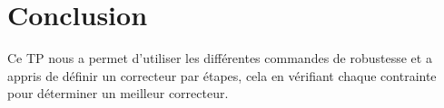 \chapter*{Conclusion}

Ce TP nous a permet d'utiliser les différentes commandes de robustesse et a appris de définir un correcteur par étapes, cela en vérifiant chaque contrainte pour déterminer un meilleur correcteur.\\
